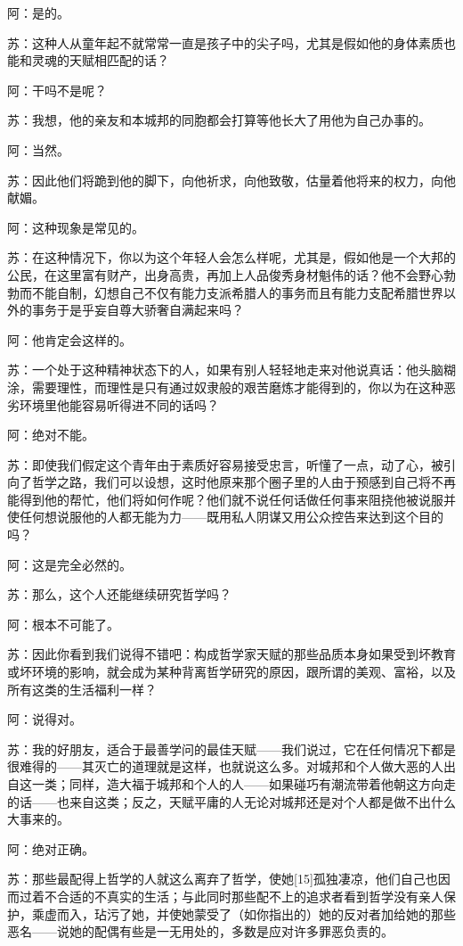 \documentclass[12pt,oneside]{book}
\begin{document}
阿：是的。

苏：这种人从童年起不就常常一直是孩子中的尖子吗，尤其是假如他的身体素质也能和灵魂的天赋相匹配的话？

阿：干吗不是呢？

苏：我想，他的亲友和本城邦的同胞都会打算等他长大了用他为自己办事的。

阿：当然。

苏：因此他们将跪到他的脚下，向他祈求，向他致敬，估量着他将来的权力，向他献媚。

阿：这种现象是常见的。

苏：在这种情况下，你以为这个年轻人会怎么样呢，尤其是，假如他是一个大邦的公民，在这里富有财产，出身高贵，再加上人品俊秀身材魁伟的话？他不会野心勃勃而不能自制，幻想自己不仅有能力支派希腊人的事务而且有能力支配希腊世界以外的事务于是乎妄自尊大骄奢自满起来吗？

阿：他肯定会这样的。

苏：一个处于这种精神状态下的人，如果有别人轻轻地走来对他说真话：他头脑糊涂，需要理性，而理性是只有通过奴隶般的艰苦磨炼才能得到的，你以为在这种恶劣环境里他能容易听得进不同的话吗？

阿：绝对不能。

苏：即使我们假定这个青年由于素质好容易接受忠言，听懂了一点，动了心，被引向了哲学之路，我们可以设想，这时他原来那个圈子里的人由于预感到自己将不再能得到他的帮忙，他们将如何作呢？他们就不说任何话做任何事来阻挠他被说服并使任何想说服他的人都无能为力——既用私人阴谋又用公众控告来达到这个目的吗？

阿：这是完全必然的。

苏：那么，这个人还能继续研究哲学吗？

阿：根本不可能了。

苏：因此你看到我们说得不错吧：构成哲学家天赋的那些品质本身如果受到坏教育或坏环境的影响，就会成为某种背离哲学研究的原因，跟所谓的美观、富裕，以及所有这类的生活福利一样？

阿：说得对。

苏：我的好朋友，适合于最善学问的最佳天赋——我们说过，它在任何情况下都是很难得的——其灭亡的道理就是这样，也就说这么多。对城邦和个人做大恶的人出自这一类；同样，造大福于城邦和个人的人——如果碰巧有潮流带着他朝这方向走的话——也来自这类；反之，天赋平庸的人无论对城邦还是对个人都是做不出什么大事来的。

阿：绝对正确。

苏：那些最配得上哲学的人就这么离弃了哲学，使她[15]孤独凄凉，他们自己也因而过着不合适的不真实的生活；与此同时那些配不上的追求者看到哲学没有亲人保护，乘虚而入，玷污了她，并使她蒙受了（如你指出的）她的反对者加给她的那些恶名——说她的配偶有些是一无用处的，多数是应对许多罪恶负责的。
\end{document}

